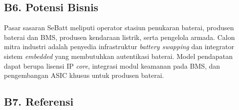 \documentclass[11pt,a4paper]{article}
\begin{document}
\subsection{B6. Potensi Bisnis}

Pasar sasaran SeBatt meliputi operator stasiun penukaran baterai, produsen baterai dan BMS, produsen kendaraan listrik, serta pengelola armada. Calon mitra industri adalah penyedia infrastruktur \textit{battery swapping} dan integrator sistem \textit{embedded} yang membutuhkan autentikasi baterai. Model pendapatan dapat berupa lisensi IP \textit{core}, integrasi modul keamanan pada BMS, dan pengembangan ASIC khusus untuk produsen baterai.

\subsection{B7. Referensi}
\end{document}
